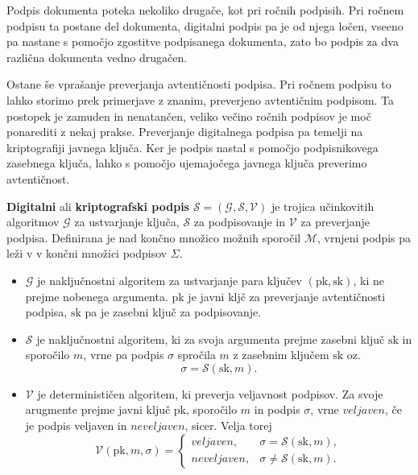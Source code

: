 \documentclass[isrm2, tisk]{fmfdelo}
\begin{document}
Podpis dokumenta poteka nekoliko drugače, kot pri ročnih podpisih. Pri ročnem podpisu ta postane del 
dokumenta, digitalni podpis pa je od njega ločen, vseeno pa nastane s pomočjo zgostitve podpisanega 
dokumenta, zato bo podpis za dva različna dokumenta vedno drugačen.

Ostane še vprašanje preverjanja avtentičnosti podpisa. Pri ročnem podpisu to lahko storimo prek 
primerjave z znanim, preverjeno avtentičnim podpisom. Ta postopek je zamuden in nenatančen, veliko 
večino ročnih podpisov je moč ponarediti z nekaj prakse. Preverjanje digitalnega podpisa pa temelji 
na kriptografiji javnega ključa. Ker je podpis nastal s pomočjo podpisnikovega zasebnega ključa,
lahko s pomočjo ujemajočega javnega ključa preverimo avtentičnost.

\begin{definicija}
\label{def:digisig}
    \textbf{Digitalni} ali \textbf{kriptografski podpis} $\mathcal{S} = (\mathcal{G}, \mathcal{S}, 
    \mathcal{V})$ je trojica učinkovitih algoritmov $\mathcal{G}$ za ustvarjanje ključa, $\mathcal{S}$ 
    za podpisovanje in $\mathcal{V}$ za preverjanje podpisa. Definirana je nad končno množico možnih 
    sporočil $\mathcal{M}$, vrnjeni podpis pa leži v v končni množici podpisov $\Sigma$.
    \begin{itemize}
        \item $\mathcal{G}$ je naključnostni algoritem za ustvarjanje para ključev $(\text{pk}, \text{sk})$, 
            ki ne prejme nobenega argumenta. $\text{pk}$ je javni kljč za preverjanje avtentičnosti 
            podpisa, $\text{sk}$ pa je zasebni ključ za podpisovanje. 
        \item $\mathcal{S}$ je naključnostni algoritem, ki za svoja argumenta prejme zasebni ključ $\text{sk}$ 
            in sporočilo $m$, vrne pa podpis $\sigma$ spročila $m$ z zasebnim ključem $\text{sk}$ 
            oz.\ 
            $$ 
            \sigma = \mathcal{S}(\text{sk}, m).
            $$
        \item $\mathcal{V}$ je determinističen algoritem, ki preverja veljavnost podpisov. Za svoje arugmente 
            prejme javni ključ $\text{pk}$, sporočilo $m$ in podpis $\sigma$, vrne $veljaven$, če je podpis 
            veljaven in $neveljaven$, sicer. Velja torej
            $$ 
            \mathcal{V}(\text{pk}, m, \sigma) = 
            \begin{cases}
                veljaven, & \sigma = \mathcal{S}(\text{sk}, m), \\
                neveljaven, & \sigma \neq \mathcal{S}(\text{sk}, m).
            \end{cases}
            $$
    \end{itemize}
\end{definicija}
\end{document}
